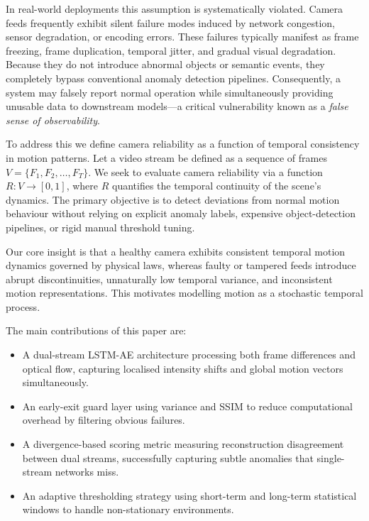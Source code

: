 \documentclass[conference]{IEEEtran}
\begin{document}
In real-world deployments this assumption is systematically violated.
Camera feeds frequently exhibit silent failure modes induced by network
congestion, sensor degradation, or encoding errors.  These failures
typically manifest as frame freezing, frame duplication, temporal jitter,
and gradual visual degradation.  Because they do not introduce abnormal
objects or semantic events, they completely bypass conventional anomaly
detection pipelines.  Consequently, a system may falsely report normal
operation while simultaneously providing unusable data to downstream
models---a critical vulnerability known as a \textit{false sense of
observability}.

To address this we define camera reliability as a function of temporal
consistency in motion patterns.  Let a video stream be defined as a
sequence of frames $V = \{F_1, F_2, \ldots, F_T\}$.  We seek to evaluate
camera reliability via a function $R: V \rightarrow [0,1]$, where $R$
quantifies the temporal continuity of the scene's dynamics.  The primary
objective is to detect deviations from normal motion behaviour without
relying on explicit anomaly labels, expensive object-detection pipelines,
or rigid manual threshold tuning.

Our core insight is that a healthy camera exhibits consistent temporal
motion dynamics governed by physical laws, whereas faulty or tampered
feeds introduce abrupt discontinuities, unnaturally low temporal variance,
and inconsistent motion representations.  This motivates modelling motion
as a stochastic temporal process.

The main contributions of this paper are:
\begin{itemize}
    \item A dual-stream LSTM-AE architecture processing both frame
          differences and optical flow, capturing localised intensity
          shifts and global motion vectors simultaneously.
    \item An early-exit guard layer using variance and SSIM to reduce
          computational overhead by filtering obvious failures.
    \item A divergence-based scoring metric measuring reconstruction
          disagreement between dual streams, successfully capturing subtle
          anomalies that single-stream networks miss.
    \item An adaptive thresholding strategy using short-term and
          long-term statistical windows to handle non-stationary
          environments.
\end{itemize}
\end{document}
